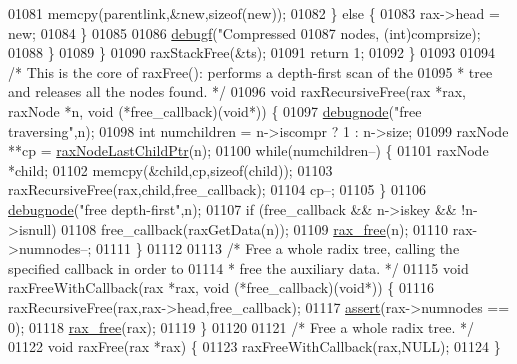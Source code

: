 \begin{DoxyCode}
{{{{{{{{{{{{{{{{{01081                 memcpy(parentlink,&\textcolor{keyword}{new},\textcolor{keyword}{sizeof}(\textcolor{keyword}{new}));
01082             \} \textcolor{keywordflow}{else} \{
01083                 rax->head = \textcolor{keyword}{new};
01084             \}
01085 
01086             \hyperlink{rax_8c_a10b215c81aa397dbc44adfb3e436befb}{debugf}(\textcolor{stringliteral}{"Compressed %
01087                 nodes, (\textcolor{keywordtype}{int})comprsize);
01088         \}
01089     \}
01090     raxStackFree(&ts);
01091     \textcolor{keywordflow}{return} 1;
01092 \}
01093 
01094 \textcolor{comment}{/* This is the core of raxFree(): performs a depth-first scan of the}
01095 \textcolor{comment}{ * tree and releases all the nodes found. */}
01096 \textcolor{keywordtype}{void} raxRecursiveFree(rax *rax, raxNode *n, \textcolor{keywordtype}{void} (*free\_callback)(\textcolor{keywordtype}{void}*)) \{
01097     \hyperlink{rax_8c_a622b73fbdc398cdbfa8cc1fb87283cb4}{debugnode}(\textcolor{stringliteral}{"free traversing"},n);
01098     \textcolor{keywordtype}{int} numchildren = n->iscompr ? 1 : n->size;
01099     raxNode **cp = \hyperlink{rax_8c_a2c5310b0d00672508a8f935a7109f4ce}{raxNodeLastChildPtr}(n);
01100     \textcolor{keywordflow}{while}(numchildren--) \{
01101         raxNode *child;
01102         memcpy(&child,cp,\textcolor{keyword}{sizeof}(child));
01103         raxRecursiveFree(rax,child,free\_callback);
01104         cp--;
01105     \}
01106     \hyperlink{rax_8c_a622b73fbdc398cdbfa8cc1fb87283cb4}{debugnode}(\textcolor{stringliteral}{"free depth-first"},n);
01107     \textcolor{keywordflow}{if} (free\_callback && n->iskey && !n->isnull)
01108         free\_callback(raxGetData(n));
01109     \hyperlink{rax__malloc_8h_a3adfa16bca6cd23b6e125fd441465e49}{rax\_free}(n);
01110     rax->numnodes--;
01111 \}
01112 
01113 \textcolor{comment}{/* Free a whole radix tree, calling the specified callback in order to}
01114 \textcolor{comment}{ * free the auxiliary data. */}
01115 \textcolor{keywordtype}{void} raxFreeWithCallback(rax *rax, \textcolor{keywordtype}{void} (*free\_callback)(\textcolor{keywordtype}{void}*)) \{
01116     raxRecursiveFree(rax,rax->head,free\_callback);
01117     \hyperlink{redisassert_8h_a993abaa2c168852c1592879472938781}{assert}(rax->numnodes == 0);
01118     \hyperlink{rax__malloc_8h_a3adfa16bca6cd23b6e125fd441465e49}{rax\_free}(rax);
01119 \}
01120 
01121 \textcolor{comment}{/* Free a whole radix tree. */}
01122 \textcolor{keywordtype}{void} raxFree(rax *rax) \{
01123     raxFreeWithCallback(rax,NULL);
01124 \}
}}}}}}}}}}}}}}}}}}
\end{DoxyCode}
